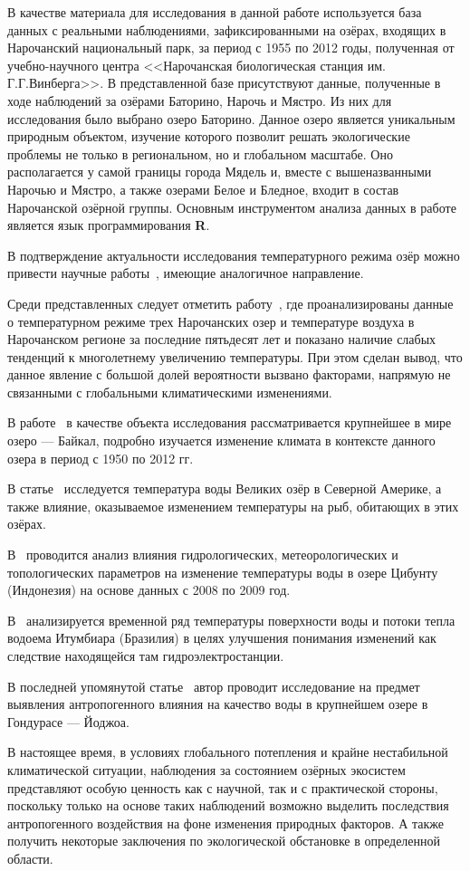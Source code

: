 В качестве материала для исследования в данной работе используется база данных с реальными наблюдениями, зафиксированными на озёрах, входящих в Нарочанский национальный парк, за период с 1955 по 2012 годы, полученная от учебно-научного центра <<Нарочанская биологическая станция им. Г.Г.Винберга>>. В представленной базе присутствуют данные, полученные в ходе наблюдений за озёрами Баторино, Нарочь и Мястро. Из них для исследования было выбрано озеро Баторино. Данное озеро является уникальным природным объектом, изучение которого позволит решать экологические проблемы не только в региональном, но и глобальном масштабе. Оно располагается у самой границы города Мядель и, вместе с вышеназванными Нарочью и Мястро, а также озерами Белое и Бледное, входит в состав Нарочанской озёрной группы. Основным инструментом анализа данных в работе является язык программирования \textbf{R}.

В подтверждение актуальности исследования температурного режима озёр можно привести научные работы~\cite{zhukova2014, Katz2011, OBrien2012a, Subehi2011, ALCANTARA2011, Chokshi2006}, имеющие аналогичное направление.

Среди представленных следует отметить работу~\cite{zhukova2014}, где проанализированы данные о температурном режиме трех Нарочанских озер и температуре воздуха в Нарочанском регионе за последние пятьдесят лет и показано наличие слабых тенденций к многолетнему увеличению температуры. При этом сделан вывод, что данное явление с большой долей вероятности вызвано факторами, напрямую не связанными с глобальными климатическими изменениями.

В работе~\cite{Katz2011} в качестве объекта исследования рассматривается крупнейшее в мире озеро --- Байкал, подробно изучается изменение климата в контексте данного озера в период с 1950 по 2012 гг.

В статье~\cite{OBrien2012a} исследуется температура воды Великих озёр в Северной Америке, а также влияние, оказываемое изменением температуры на рыб, обитающих в этих озёрах.

В~\cite{Subehi2011} проводится анализ влияния гидрологических, метеорологических и топологических параметров на изменение температуры воды в озере Цибунту (Индонезия) на основе данных с 2008 по 2009 год.

В~\cite{ALCANTARA2011} анализируется временной ряд температуры поверхности воды и потоки тепла водоема Итумбиара (Бразилия) в целях улучшения понимания изменений как следствие находящейся там гидроэлектростанции.

В последней упомянутой статье~\cite{Chokshi2006} автор проводит исследование на предмет выявления антропогенного влияния на качество воды в крупнейшем озере в Гондурасе --- Йоджоа.

В настоящее время, в условиях глобального потепления и крайне нестабильной климатической ситуации, наблюдения за состоянием озёрных экосистем представляют особую ценность как с научной, так и с практической стороны, поскольку только на основе таких наблюдений возможно выделить последствия антропогенного воздействия на фоне изменения природных факторов. А также получить некоторые заключения по экологической обстановке в определенной области.
